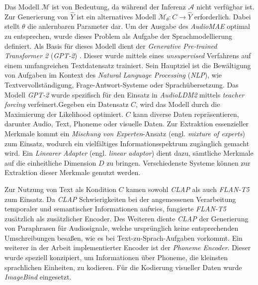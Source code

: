 \documentclass[
  a4paper,  %
  twoside,  %
  bibliography=totoc,
  headsepline,
  cleardoublepage=empty,
  parskip=half,
  draft=false
]{scrbook}
\begin{document}
Das Modell $\mathcal{M}$ ist von Bedeutung, da während der Inferenz $\mathcal{A}$ nicht verfügbar ist. Zur Generierung von $\hat{Y}$ ist ein alternatives Modell $\mathcal{M}_\theta: C \rightarrow \hat{Y}$ erforderlich. Dabei stellt $\theta$ die anlernbaren Parameter dar. Um der Ausgabe des \emph{AudioMAE} optimal zu entsprechen, wurde dieses Problem als Aufgabe der Sprachmodellierung definiert. Als Basis für dieses Modell dient der \emph{Generative Pre-trained Transformer 2} (\emph{GPT-2}) \cite{alec_radford_jeff_wu_rewon_child_david_luan_dario_amodei_ilya_sutskever_language_2019}. Dieser wurde mittels eines \emph{unsupervised} Verfahrens auf einem umfangreichen Textdatensatz trainiert. Sein Hauptziel ist die Bewältigung von Aufgaben im Kontext des \emph{Natural Language Processing} (\emph{NLP}), wie Textvervollständigung, Frage-Antwort-Systeme oder Sprachübersetzung. Das Modell \emph{GPT-2} wurde spezifisch für den Einsatz in \emph{AudioLDM2} mittels \emph{teacher forcing} \cite{kolen_field_2001} verfeinert.Gegeben ein Datensatz $C$, wird das Modell durch die Maximierung der Likelihood optimiert. $C$ kann diverse Daten repräsentieren, darunter Audio, Text, Phoneme oder visuelle Daten. Zur Extraktion essenzieller Merkmale kommt ein \emph{Mischung von Experten}-Ansatz (engl. \emph{mixture of experts}) \cite{masoudnia_mixture_2014} zum Einsatz, wodurch ein vielfältiges Informationsspektrum zugänglich gemacht wird. Ein \emph{Linearer Adapter} (engl. \emph{linear adaptor}) dient dazu, sämtliche Merkmale auf die einheitliche Dimension $D$ zu bringen. Verschiedenste Systeme können zur Extraktion dieser Merkmale genutzt werden. \cite{liu_audioldm2_2023}

Zur Nutzung von Text als Kondition $C$ kamen sowohl \emph{CLAP} \cite{wu_large-scale_2023} als auch \emph{FLAN-T5} \cite{chung_scaling_2022} zum Einsatz. Da \emph{CLAP} Schwierigkeiten bei der angemessenen Verarbeitung temporaler und semantischer Informationen aufwies, fungierte \emph{FLAN-T5} zusätzlich als zusätzlicher Encoder. Des Weiteren diente \emph{CLAP} der Generierung von Paraphrasen für Audiosignale, welche ursprünglich keine entsprechenden Umschreibungen besaßen, wie es bei Text-zu-Sprach-Aufgaben vorkommt. Ein weiterer in der Arbeit implementierter Encoder ist der \emph{Phoneme Encoder}. Dieser wurde speziell konzipiert, um Informationen über Phoneme, die kleinsten sprachlichen Einheiten, zu kodieren. Für die Kodierung visueller Daten wurde \emph{ImageBind} \cite{girdhar_imagebind_2023} eingesetzt. \cite{liu_audioldm2_2023}
\end{document}
